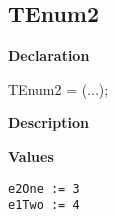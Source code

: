 \documentclass{report}
\begin{document}
\subsection*{TEnum2}
\begin{list}{}{
\setlength{\itemindent}{0cm}
\setlength{\listparindent}{0cm}
\setlength{\leftmargin}{\evensidemargin}
\addtolength{\leftmargin}{\tmplength}
\settowidth{\labelsep}{X}
\addtolength{\leftmargin}{\labelsep}
\setlength{\labelwidth}{\tmplength}
}
\begin{flushleft}
\item[\textbf{Declaration}\hfill]
\begin{ttfamily}
TEnum2 = (...);\end{ttfamily}


\end{flushleft}
\par
\item[\textbf{Description}]
 \item[\textbf{Values}]
\begin{description}
\item[\texttt{e2One := 3}]  
\item[\texttt{e1Two := 4}]  
\end{description}


\end{list}
\end{document}
